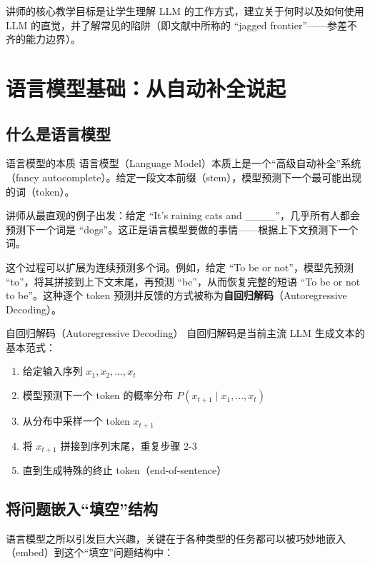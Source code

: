 \documentclass[a4paper]{article}
\begin{document}
讲师的核心教学目标是让学生理解 LLM 的工作方式，建立关于何时以及如何使用 LLM 的直觉，并了解常见的陷阱（即文献中所称的 ``jagged frontier''——参差不齐的能力边界）。

\section{语言模型基础：从自动补全说起}

\subsection{什么是语言模型}

\begin{importantbox}{语言模型的本质}
语言模型（Language Model）本质上是一个``高级自动补全''系统（fancy autocomplete）。给定一段文本前缀（stem），模型预测下一个最可能出现的词（token）。
\end{importantbox}

讲师从最直观的例子出发：给定 ``It's raining cats and \_\_\_\_''，几乎所有人都会预测下一个词是 ``dogs''。这正是语言模型要做的事情——根据上下文预测下一个词。

这个过程可以扩展为连续预测多个词。例如，给定 ``To be or not''，模型先预测 ``to''，将其拼接到上下文末尾，再预测 ``be''，从而恢复完整的短语 ``To be or not to be''。这种逐个 token 预测并反馈的方式被称为\textbf{自回归解码}（Autoregressive Decoding）。

\begin{knowledgebox}{自回归解码（Autoregressive Decoding）}
自回归解码是当前主流 LLM 生成文本的基本范式：
\begin{enumerate}
    \item 给定输入序列 $x_1, x_2, \dots, x_t$
    \item 模型预测下一个 token 的概率分布 $P(x_{t+1} \mid x_1, \dots, x_t)$
    \item 从分布中采样一个 token $x_{t+1}$
    \item 将 $x_{t+1}$ 拼接到序列末尾，重复步骤 2-3
    \item 直到生成特殊的终止 token（end-of-sentence）
\end{enumerate}
\end{knowledgebox}

\subsection{将问题嵌入``填空''结构}

语言模型之所以引发巨大兴趣，关键在于各种类型的任务都可以被巧妙地嵌入（embed）到这个``填空''问题结构中：
\end{document}
